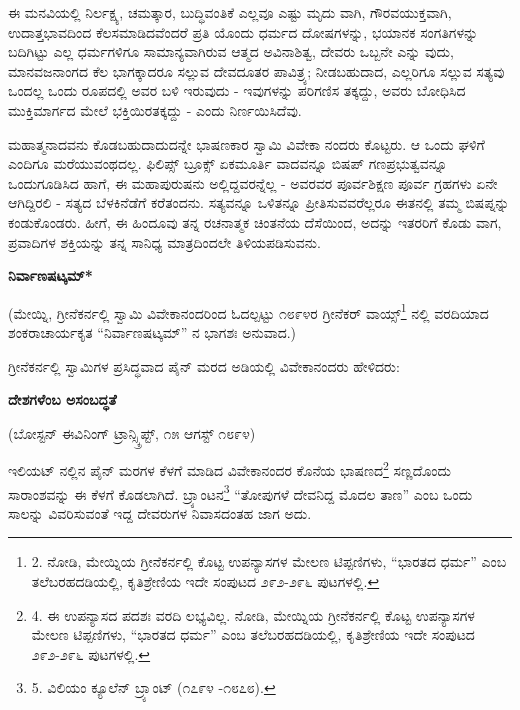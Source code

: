 ಈ ಮನವಿಯಲ್ಲಿ ನಿರ್ಲಕ್ಷ್ಯ, ಚಮತ್ಕಾರ, ಬುದ್ಧಿವಂತಿಕೆ ಎಲ್ಲವೂ ಎಷ್ಟು ಮೃದು ವಾಗಿ, ಗೌರವಯುಕ್ತವಾಗಿ, ಉದಾತ್ತಭಾವದಿಂದ ಕೆಲಸಮಾಡಿದವೆಂದರೆ ಪ್ರತಿ ಯೊಂದು ಧರ್ಮದ ದೋಷಗಳನ್ನು, ಭಯಾನಕ ಸಂಗತಿಗಳನ್ನು ಬದಿಗಿಟ್ಟು ಎಲ್ಲ ಧರ್ಮಗಳಿಗೂ ಸಾಮಾನ್ಯವಾಗಿರುವ ಆತ್ಮದ ಅವಿನಾಶಿತ್ವ, ದೇವರು ಒಬ್ಬನೇ ಎನ್ನು ವುದು, ಮಾನವಜನಾಂಗದ ಕೆಲ ಭಾಗಕ್ಕಾದರೂ ಸಲ್ಲುವ ದೇವದೂತರ ಪಾವಿತ್ರ್ಯ; ನೀಡಬಹುದಾದ, ಎಲ್ಲರಿಗೂ ಸಲ್ಲುವ ಸತ್ಯವು ಒಂದಲ್ಲ ಒಂದು ರೂಪದಲ್ಲಿ ಅವರ ಬಳಿ ಇರುವುದು - ಇವುಗಳನ್ನು ಪರಿಗಣಿಸ ತಕ್ಕದ್ದು, ಅವರು ಬೋಧಿಸಿದ ಮುಕ್ತಿಮಾರ್ಗದ ಮೇಲೆ ಭಕ್ತಿಯಿರತಕ್ಕದ್ದು - ಎಂದು ನಿರ್ಣಯಿಸಿದೆವು.

ಮಹಾತ್ಮನಾದವನು ಕೊಡಬಹುದಾದುದನ್ನೇ ಭಾಷಣಕಾರ ಸ್ವಾಮಿ ವಿವೇಕಾ ನಂದರು ಕೊಟ್ಟರು. ಆ ಒಂದು ಘಳಿಗೆ ಎಂದಿಗೂ ಮರೆಯುವಂಥದಲ್ಲ. ಫಿಲಿಪ್ಸ್ ಬ್ರೂಕ್ಸ್ ಏಕಮೂರ್ತಿ ವಾದವನ್ನೂ ಬಿಷಪ್ ಗಣಪ್ರಭುತ್ವವನ್ನೂ ಒಂದುಗೂಡಿಸಿದ ಹಾಗೆ, ಈ ಮಹಾಪುರುಷನು ಅಲ್ಲಿದ್ದವರನ್ನೆಲ್ಲ - ಅವರವರ ಪೂರ್ವಶಿಕ್ಷಣ ಪೂರ್ವ ಗ್ರಹಗಳು ಏನೇ ಆಗಿದ್ದಿರಲಿ - ಸತ್ಯದ ಬೆಳಕಿನೆಡೆಗೆ ಕರೆತಂದನು. ಸತ್ಯವನ್ನೂ ಒಳಿತನ್ನೂ ಪ್ರೀತಿಸುವವರೆಲ್ಲರೂ ಈತನಲ್ಲಿ ತಮ್ಮ ಬಿಷಪ್ನನ್ನು ಕಂಡುಕೊಂಡರು. ಹೀಗೆ, ಈ ಹಿಂದೂವು ತನ್ನ ರಚನಾತ್ಮಕ ಚಿಂತನೆಯ ದೆಸೆಯಿಂದ, ಅದನ್ನು ಇತರರಿಗೆ ಕೊಡು ವಾಗ, ಪ್ರವಾದಿಗಳ ಶಕ್ತಿಯನ್ನು ತನ್ನ ಸಾನಿಧ್ಯ ಮಾತ್ರದಿಂದಲೇ ತಿಳಿಯಪಡಿಸುವನು.

\begin{center}
\textbf{ನಿರ್ವಾಣಷಟ್ಕಮ್​*}
\end{center}

(ಮೇಯ್ನಿ, ಗ್ರೀನೆಕರ್ನಲ್ಲಿ ಸ್ವಾಮಿ ವಿವೇಕಾನಂದರಿಂದ ಓದಲ್ಪಟ್ಟು ೧೮೯೪ರ ಗ್ರೀನೆಕರ್ ವಾಯ್ಸ್\footnote{2. ನೋಡಿ, ಮೇಯ್ನಿಯ ಗ್ರೀನೆಕರ್ನಲ್ಲಿ ಕೊಟ್ಟ ಉಪನ್ಯಾಸಗಳ ಮೇಲಣ ಟಿಪ್ಪಣಿಗಳು, “ಭಾರತದ ಧರ್ಮ” ಎಂಬ ತಲೆಬರಹದಡಿಯಲ್ಲಿ, ಕೃತಿಶ್ರೇಣಿಯ ಇದೇ ಸಂಪುಟದ ೨೯೨-೨೯೬ ಪುಟಗಳಲ್ಲಿ.} ನಲ್ಲಿ ವರದಿಯಾದ ಶಂಕರಾಚಾರ್ಯಕೃತ “ನಿರ್ವಾಣಷಟ್ಕಮ್​” ನ ಭಾಗಶಃ ಅನುವಾದ.)

ಗ್ರೀನೆಕರ್ನಲ್ಲಿ ಸ್ವಾಮಿಗಳ ಪ್ರಸಿದ್ಧವಾದ ಪೈನ್ ಮರದ ಅಡಿಯಲ್ಲಿ ವಿವೇಕಾನಂದರು ಹೇಳಿದರು:

\begin{center}
\textbf{ದೇಶಗಳೆಂಬ ಅಸಂಬದ್ಧತೆ}
\end{center}

\begin{center}
(ಬೋಸ್ಟನ್ ಈವಿನಿಂಗ್ ಟ್ರಾನ್ಸ್ಕ್ರಿಪ್ಟ್, ೧೫ ಆಗಸ್ಟ್ ೧೮೯೪)
\end{center}

ಇಲಿಯಟ್ ನಲ್ಲಿನ ಪೈನ್ ಮರಗಳ ಕೆಳಗೆ ಮಾಡಿದ ವಿವೇಕಾನಂದರ ಕೊನೆಯ ಭಾಷಣದ\footnote{4. ಈ ಉಪನ್ಯಾಸದ ಪದಶಃ ವರದಿ ಲಭ್ಯವಿಲ್ಲ. ನೋಡಿ, ಮೇಯ್ನಿಯ ಗ್ರೀನೆಕರ್ನಲ್ಲಿ ಕೊಟ್ಟ ಉಪನ್ಯಾಸಗಳ ಮೇಲಣ ಟಿಪ್ಪಣಿಗಳು, “ಭಾರತದ ಧರ್ಮ” ಎಂಬ ತಲೆಬರಹದಡಿಯಲ್ಲಿ, ಕೃತಿಶ್ರೇಣಿಯ ಇದೇ ಸಂಪುಟದ ೨೯೨-೨೯೬ ಪುಟಗಳಲ್ಲಿ.} ಸಣ್ಣದೊಂದು ಸಾರಾಂಶವನ್ನು ಈ ಕೆಳಗೆ ಕೊಡಲಾಗಿದೆ. ಬ್ರ್ಯಾಂಟನ\footnote{5. ವಿಲಿಯಂ ಕ್ಯೂಲೆನ್ ಬ್ರ್ಯಾಂಟ್ (೧೭೯೪ -೧೮೭೮).} “ತೋಪುಗಳೆ ದೇವನಿದ್ದ ಮೊದಲ ತಾಣ” ಎಂಬ ಒಂದು ಸಾಲನ್ನು ವಿವರಿಸುವಂತೆ ಇದ್ದ ದೇವರುಗಳ ನಿವಾಸದಂತಹ ಜಾಗ ಅದು.

